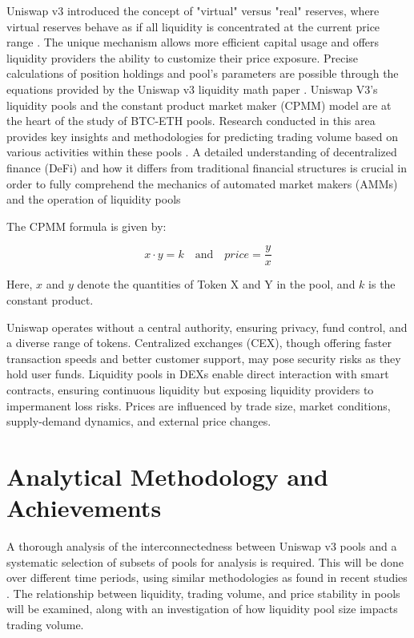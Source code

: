 \documentclass{article}
\begin{document}
Uniswap v3 introduced the concept of "virtual" versus "real" reserves, where virtual reserves behave as if all liquidity is concentrated at the current price range \cite{Elsts2021}. The unique mechanism allows more efficient capital usage and offers liquidity providers the ability to customize their price exposure. Precise calculations of position holdings and pool's parameters are possible through the equations provided by the Uniswap v3 liquidity math paper \cite{Elsts2021,Miori2023}. Uniswap V3's liquidity pools and the constant product market maker (CPMM) model are at the heart of the study of BTC-ETH pools. Research conducted in this area provides key insights and methodologies for predicting trading volume based on various activities within these pools \cite{Miori2023}. A detailed understanding of decentralized finance (DeFi) and how it differs from traditional financial structures is crucial in order to fully comprehend the mechanics of automated market makers (AMMs) and the operation of liquidity pools \cite{Makarov2022}

The CPMM formula is given by:

\[x \cdot y = k \quad \text{and} \quad price = \frac{y}{x}\]

Here, \(x\) and \(y\) denote the quantities of Token X and Y in the pool, and \(k\) is the constant product\cite{Makarov2022,Miori2023}.

Uniswap operates without a central authority, ensuring privacy, fund control, and a diverse range of tokens\cite{Miori2023}. Centralized exchanges (CEX), though offering faster transaction speeds and better customer support, may pose security risks as they hold user funds\cite{Makarov2022}. Liquidity pools in DEXs enable direct interaction with smart contracts, ensuring continuous liquidity but exposing liquidity providers to impermanent loss risks\cite{Aigner2021, Heimbach2022}. Prices are influenced by trade size, market conditions, supply-demand dynamics, and external price changes\cite{Miori2022,Heimbach2022,Miori2023}.

\pagebreak
\section*{\textbf{Analytical Methodology and Achievements}}

A thorough analysis of the interconnectedness between Uniswap v3 pools and a systematic selection of subsets of pools for analysis is required. This will be done over different time periods, using similar methodologies as found in recent studies \cite{Miori2022}. The relationship between liquidity, trading volume, and price stability in pools will be examined, along with an investigation of how liquidity pool size impacts trading volume.
\end{document}
